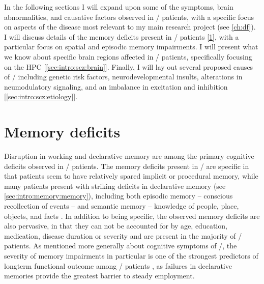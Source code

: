 In the following sections I will expand upon some of the symptoms, brain abnormalities, and causative factors observed in \scz/ patients, with a specific focus on aspects of the disease most relevant to my main research project (see \autoref{ch:df}).
I will discuss details of the memory deficits present in \scz/ patients [\ref{sec:intro:scz:memory}], with a particular focus on spatial and episodic memory impairments.
I will present what we know about specific brain regions affected in \scz/ patients, specifically focusing on the \ac{HPC} [\ref{sec:intro:scz:brain}].
Finally, I will lay out several proposed causes of \scz/ including genetic risk factors, neurodevelopmental insults, alterations in neumodulatory signaling, and an imbalance in excitation and inhibition [\ref{sec:intro:scz:etiology}].

\section{Memory deficits}
\label{sec:intro:scz:memory}
Disruption in working and declarative memory are among the primary cognitive deficits observed in \scz/ patients.
The memory deficits present in \scz/ are specific in that patients seem to have relatively spared implicit or procedural memory, while many patients present with striking deficits in declarative memory (see \autoref{sec:intro:memory:memory}), including both episodic memory -- conscious recollection of events -- and semantic memory -- knowledge of people, place, objects, and facts \citep{O'Carroll2000, Aleman1999, Gold2010}.
In addition to being specific, the observed memory deficits are also pervasive, in that they can not be accounted for by age, education, medication, disease duration or severity \citep{Ranganath2008} and are present in the majority of \scz/ patients.
As mentioned more generally about cognitive symptoms of \scz/, the severity of memory impairments in particular is one of the strongest predictors of longterm functional outcome among \scz/ patients \citep{Green1996}, as failures in declarative memories provide the greatest barrier to steady employment.

